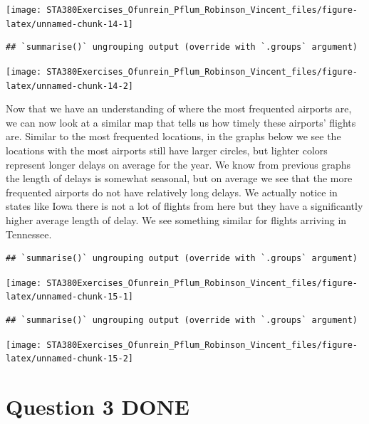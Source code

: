 \documentclass[
]{article}
\begin{document}
\begin{center}\texttt{[image: STA380Exercises\_Ofunrein\_Pflum\_Robinson\_Vincent\_files/figure-latex/unnamed-chunk-14-1]} \end{center}

\begin{verbatim}
## `summarise()` ungrouping output (override with `.groups` argument)
\end{verbatim}

\begin{center}\texttt{[image: STA380Exercises\_Ofunrein\_Pflum\_Robinson\_Vincent\_files/figure-latex/unnamed-chunk-14-2]} \end{center}

Now that we have an understanding of where the most frequented airports
are, we can now look at a similar map that tells us how timely these
airports' flights are. Similar to the most frequented locations, in the
graphs below we see the locations with the most airports still have
larger circles, but lighter colors represent longer delays on average
for the year. We know from previous graphs the length of delays is
somewhat seasonal, but on average we see that the more frequented
airports do not have relatively long delays. We actually notice in
states like Iowa there is not a lot of flights from here but they have a
significantly higher average length of delay. We see something similar
for flights arriving in Tennessee.

\begin{verbatim}
## `summarise()` ungrouping output (override with `.groups` argument)
\end{verbatim}

\begin{center}\texttt{[image: STA380Exercises\_Ofunrein\_Pflum\_Robinson\_Vincent\_files/figure-latex/unnamed-chunk-15-1]} \end{center}

\begin{verbatim}
## `summarise()` ungrouping output (override with `.groups` argument)
\end{verbatim}

\begin{center}\texttt{[image: STA380Exercises\_Ofunrein\_Pflum\_Robinson\_Vincent\_files/figure-latex/unnamed-chunk-15-2]} \end{center}

\hypertarget{question-3-done}{%
\section{Question 3 DONE}\label{question-3-done}}
\end{document}
